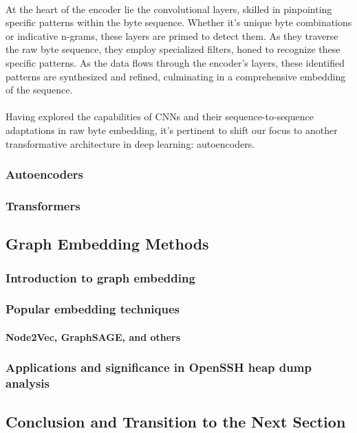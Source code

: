         \paragraph{}At the heart of the encoder lie the convolutional layers, skilled in pinpointing specific patterns within the byte sequence. Whether it's unique byte combinations or indicative n-grams, these layers are primed to detect them. As they traverse the raw byte sequence, they employ specialized filters, honed to recognize these specific patterns. As the data flows through the encoder's layers, these identified patterns are synthesized and refined, culminating in a comprehensive embedding of the sequence.
        
        \paragraph{}Having explored the capabilities of CNNs and their sequence-to-sequence adaptations in raw byte embedding, it's pertinent to shift our focus to another transformative architecture in deep learning: autoencoders. 
    \subsubsection{Autoencoders}
    \subsubsection{Transformers}
\subsection{Graph Embedding Methods}
    \subsubsection{Introduction to graph embedding}
    \subsubsection{Popular embedding techniques}
        \paragraph{Node2Vec, GraphSAGE, and others}
    \subsubsection{Applications and significance in OpenSSH heap dump analysis}

\subsection{Conclusion and Transition to the Next Section}
